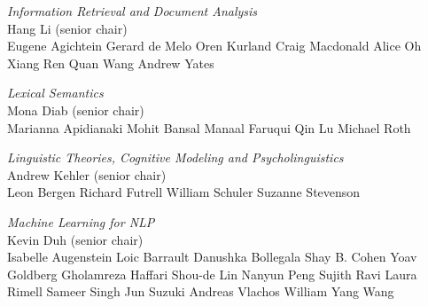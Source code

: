 \emph{Information Retrieval and Document Analysis} \\
\hspace*{0.2in}Hang Li (senior chair) \\
\hspace*{0.2in}Eugene Agichtein
\hspace*{0.2in}Gerard de Melo
\hspace*{0.2in}Oren Kurland
\hspace*{0.2in}Craig Macdonald
\hspace*{0.2in}Alice Oh
\hspace*{0.2in}Xiang Ren
\hspace*{0.2in}Quan Wang
\hspace*{0.2in}Andrew Yates


\emph{Lexical Semantics} \\
\hspace*{0.2in}Mona Diab (senior chair) \\ 
\hspace*{0.2in}Marianna Apidianaki
\hspace*{0.2in}Mohit Bansal
\hspace*{0.2in}Manaal Faruqui
\hspace*{0.2in}Qin Lu
\hspace*{0.2in}Michael Roth


\emph{Linguistic Theories, Cognitive Modeling and Psycholinguistics} \\
\hspace*{0.2in}Andrew Kehler (senior chair) \\ 
\hspace*{0.2in}Leon Bergen
\hspace*{0.2in}Richard Futrell
\hspace*{0.2in}William Schuler
\hspace*{0.2in}Suzanne Stevenson


\emph{Machine Learning for NLP} \\
\hspace*{0.2in}Kevin Duh (senior chair) \\
\hspace*{0.2in}Isabelle Augenstein
\hspace*{0.2in}Loic Barrault
\hspace*{0.2in}Danushka Bollegala
\hspace*{0.2in}Shay B. Cohen
\hspace*{0.2in}Yoav Goldberg
\hspace*{0.2in}Gholamreza Haffari
\hspace*{0.2in}Shou-de Lin
\hspace*{0.2in}Nanyun Peng
\hspace*{0.2in}Sujith Ravi
\hspace*{0.2in}Laura Rimell
\hspace*{0.2in}Sameer Singh
\hspace*{0.2in}Jun Suzuki
\hspace*{0.2in}Andreas Vlachos
\hspace*{0.2in}William Yang Wang


